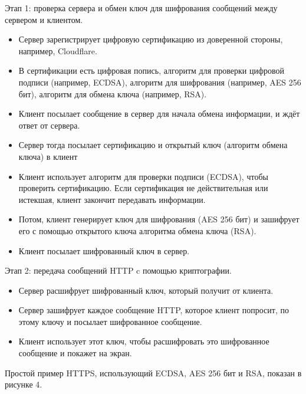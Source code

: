 Этап 1: проверка сервера и обмен ключ для шифрования сообщений между сервером и клиентом.
	\begin{itemize}[label={--},noitemsep,nolistsep]
		\item Сервер зарегистрирует цифровую сертификацию из доверенной стороны, например, Cloudflare.
		\item В сертификации есть цифровая попись, алгоритм для проверки цифровой подписи (например, ECDSA), алгоритм для шифрования (например, AES 256 бит), алгоритм для обмена ключа (например, RSA).
		\item Клиент посылает сообщение в сервер для начала обмена информации, и ждёт ответ от сервера.
		\item Сервер тогда посылает сертификацию и открытый ключ (алгоритм обмена ключа) в клиент
		\item Клиент использует алгоритм для проверки подписи (ECDSA), чтобы проверить сертификацию. Если сертификация не действительная или истекшая, клиент закончит передавать информации.
		\item Потом, клиент генерирует ключ для шифрования (AES 256 бит) и зашифрует его с помощью открытого ключа алгоритма обмена ключа (RSA).
		\item Клиент посылает шифрованный ключ в сервер.
	\end{itemize}
Этап 2: передача сообщений HTTP c помощью криптографии.
	\begin{itemize}[label={--},noitemsep,nolistsep]
		\item Сервер расшифрует шифрованный ключ, который получит от клиента.
		\item Сервер зашифрует каждое сообщение HTTP, которое клиент попросит, по этому ключу и посылает шифрованное сообщение.
		\item Клиент использует этот ключ, чтобы расшифровать это шифрованное сообщение и покажет на экран.
	\end{itemize}
Простой пример HTTPS, использующий ECDSA, AES 256 бит и RSA, показан в рисунке 4. 
